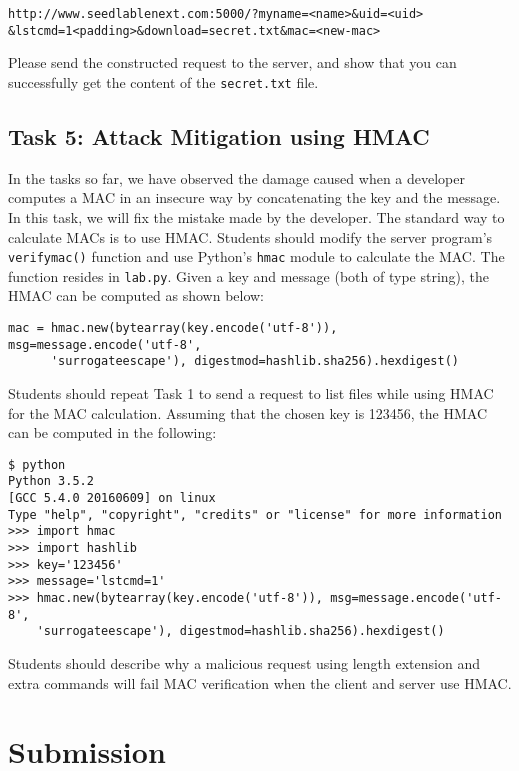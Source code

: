 \begin{lstlisting}
http://www.seedlablenext.com:5000/?myname=<name>&uid=<uid>
&lstcmd=1<padding>&download=secret.txt&mac=<new-mac>
\end{lstlisting}
 
Please send the constructed request to the server, and show that you can
successfully get the content of the \texttt{secret.txt} file.  



\subsection{Task 5: Attack Mitigation using HMAC}

In the tasks so far, we have observed the damage caused when a developer
computes a MAC in an insecure way by concatenating the key and the message.
In this task, we will fix the mistake made by the developer. The standard
way to calculate MACs is to use HMAC. Students
should modify the server program's \texttt{verify\textunderscore mac()}
function and use Python's \texttt{hmac} module to calculate the MAC. The
function resides in \texttt{lab.py}. Given a key and message (both of type
string), the HMAC can be computed as shown below:

\begin{lstlisting}
mac = hmac.new(bytearray(key.encode('utf-8')), msg=message.encode('utf-8', 
      'surrogateescape'), digestmod=hashlib.sha256).hexdigest()
\end{lstlisting}

Students should repeat Task 1 to send a request to list files while using HMAC for 
the MAC calculation. Assuming that the chosen key is 123456, the HMAC can be computed 
in the following:

\begin{lstlisting}
$ python
Python 3.5.2
[GCC 5.4.0 20160609] on linux
Type "help", "copyright", "credits" or "license" for more information
>>> import hmac
>>> import hashlib
>>> key='123456'
>>> message='lstcmd=1'
>>> hmac.new(bytearray(key.encode('utf-8')), msg=message.encode('utf-8', 
	'surrogateescape'), digestmod=hashlib.sha256).hexdigest()
\end{lstlisting}

Students should describe why a malicious request using length extension and
extra commands will fail MAC verification when the client and server use
HMAC.


\section{Submission} 

\seedsubmission













